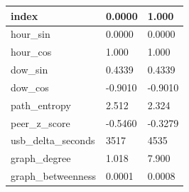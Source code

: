 \begin{tabular}{lll}
\toprule
index & 0.0000 & 1.000 \\
\midrule
hour\_sin & 0.0000 & 0.0000 \\
hour\_cos & 1.000 & 1.000 \\
dow\_sin & 0.4339 & 0.4339 \\
dow\_cos & -0.9010 & -0.9010 \\
path\_entropy & 2.512 & 2.324 \\
peer\_z\_score & -0.5460 & -0.3279 \\
usb\_delta\_seconds & 3517 & 4535 \\
graph\_degree & 1.018 & 7.900 \\
graph\_betweenness & 0.0001 & 0.0008 \\
\bottomrule
\end{tabular}